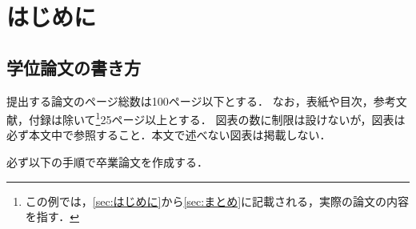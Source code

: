 \section{はじめに}\label{sec:はじめに}

\subsection{学位論文の書き方}\label{subsec:学位論文の書き方}

提出する論文のページ総数は100ページ以下とする．
なお，表紙や目次，参考文献，付録は除いて\footnote{この例では，\autoref{sec:はじめに}から\autoref{sec:まとめ}に記載される，実際の論文の内容を指す．}25ページ以上とする．
図表の数に制限は設けないが，図表は必ず本文中で参照すること．本文で述べない図表は掲載しない．


必ず以下の手順で卒業論文を作成する．


